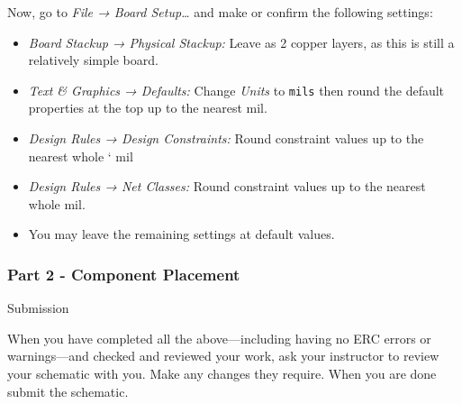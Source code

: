 \documentclass[
  letterpaper,
  DIV=11,
  numbers=noendperiod,
  oneside]{scrartcl}
\begin{document}
Now, go to \emph{File → Board Setup\ldots{}} and make or confirm the
following settings:

\begin{itemize}
\item
  \emph{Board Stackup → Physical Stackup:} Leave as 2 copper layers, as
  this is still a relatively simple board.
\item
  \emph{Text \& Graphics → Defaults:} Change \emph{Units} to
  \texttt{mils} then round the default properties at the top up to the
  nearest mil.
\item
  \emph{Design Rules → Design Constraints:} Round constraint values up
  to the nearest whole ` mil
\item
  \emph{Design Rules → Net Classes:} Round constraint values up to the
  nearest whole mil.
\item
  You may leave the remaining settings at default values.
\end{itemize}

\subsubsection{Part 2 - Component
Placement}\label{part-2---component-placement}

Submission

When you have completed all the above---including having no ERC errors
or warnings---and checked and reviewed your work, ask your instructor to
review your schematic with you. Make any changes they require. When you
are done submit the schematic.
\end{document}
